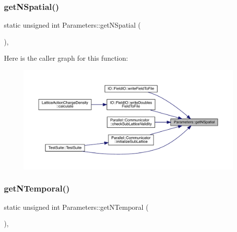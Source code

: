 \subsubsection{\texorpdfstring{getNSpatial()}{getNSpatial()}}
{\footnotesize\ttfamily static unsigned int Parameters\+::get\+N\+Spatial (\begin{DoxyParamCaption}{ }\end{DoxyParamCaption})\hspace{0.3cm}{\ttfamily [inline]}, {\ttfamily [static]}}

Here is the caller graph for this function\+:\nopagebreak
\begin{figure}[H]
\begin{center}
\leavevmode
\includegraphics[width=350pt]{class_parameters_a52b90e94a378ec9fe8c504cf546e98fa_icgraph}
\end{center}
\end{figure}
\mbox{\label{class_parameters_a237ea1286459e8c648e983464829fe8d}} 
\subsubsection{\texorpdfstring{getNTemporal()}{getNTemporal()}}
{\footnotesize\ttfamily static unsigned int Parameters\+::get\+N\+Temporal (\begin{DoxyParamCaption}{ }\end{DoxyParamCaption})\hspace{0.3cm}{\ttfamily [inline]}, {\ttfamily [static]}}

